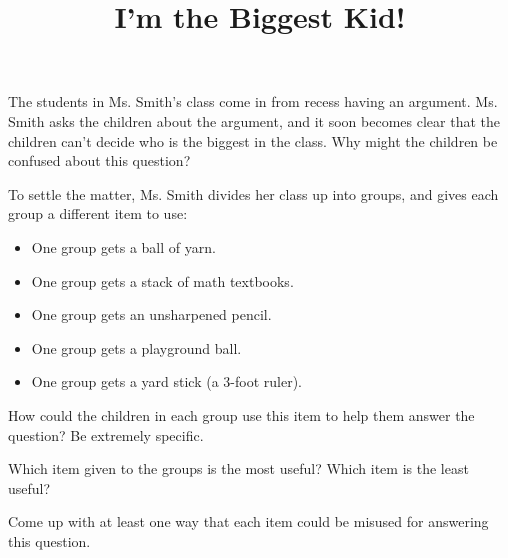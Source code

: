\documentclass[nooutcomes,noauthor]{ximera}
\title{I'm the Biggest Kid!}
\begin{document}
\begin{abstract}\end{abstract}
\maketitle



\begin{problem}
    The students in Ms. Smith's class come in from recess having an argument.  Ms. Smith asks the children about the argument, and it soon becomes clear that the children can't decide who is the biggest in the class.  Why might the children be confused about this question?
    
   
\end{problem}


\begin{problem}
    To settle the matter, Ms. Smith divides her class up into groups, and gives each group a different item to use:
    \begin{itemize}
        \item One group gets a ball of yarn.
        \item One group gets a stack of math textbooks.
        \item One group gets an unsharpened pencil.
        \item One group gets a playground ball.
        \item One group gets a yard stick (a 3-foot ruler).
    \end{itemize}
    
    How could the children in each group use this item to help them answer the question?  Be extremely specific.
    

\end{problem}

\begin{problem}
    Which item given to the groups is the most useful?  Which item is the least useful?
    
    Come up with at least one way that each item could be misused for answering this question.
    
    
\end{problem}
\end{document}
